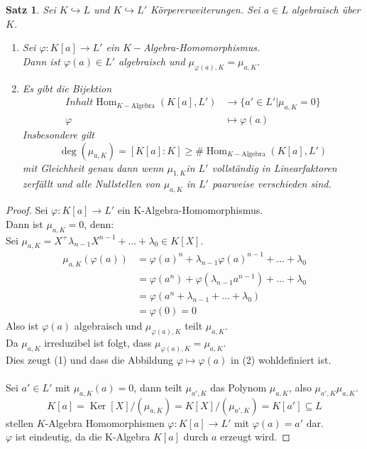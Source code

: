 \documentclass[10pt,a4paper]{article}
\newcommand{\la}{\ensuremath{\lambda}}
\newcommand{\Hom}{\operatorname{Hom}}
\newcommand{\Ker}{\ensuremath{\operatorname{Ker}}}
\newcounter{thm}[section]
\theoremstyle{definition}
\theoremstyle{plain}
\newtheorem{satz}[thm]{Satz}
\theoremstyle{remark}
\begin{document}
\begin{satz}
	Sei $K\hookrightarrow L$ und $K\hookrightarrow L'$ Körpererweiterungen. Sei $a\in L$ algebraisch über $K$.
	\begin{enumerate}
		\item Sei $\varphi:K[a]\to L'$ ein $K-$Algebra-Homomorphismus.\\
		Dann ist $\varphi(a)\in L'$ algebraisch und $\mu_{\varphi(a),K}=\mu_{a,K}$.
		\item Es gibt die Bijektion
		\begin{align*}
		Inhalt\Hom_{K-\text{Algebra}}(K[a],L')&\rightarrow \{a'\in L'|\mu_{a,K}=0\}\\
		\varphi&\mapsto\varphi(a)
		\end{align*}
		Insbesondere gilt 
		\[\deg(\mu_{a,K})=[K[a]:K]\geq \#\Hom_{K-\text{Algebra}}(K[a],L')\]
		mit Gleichheit genau dann wenn $\mu_{1,K}$in $L'$ vollständig in Linearfaktoren zerfällt und alle Nullstellen von $\mu_{a,K}$ in $L'$ paarweise verschieden sind.
	\end{enumerate}
\end{satz}
\begin{proof}
	Sei $\varphi:K[a]\rightarrow L'$ ein K-Algebra-Homomorphismus.\\
	Dann ist $\mu_{a,K}=0$, denn:\\
	Sei $\mu_{a,K}=X^+\la_{n-1}X^{n-1}+...+\la_0\in K[X]$.
	\begin{align*}
	\mu_{a,K}(\varphi(a))&=\varphi(a)^n+\la_{n-1}\varphi(a)^{n-1}+...+\la_0\\
	&=\varphi(a^n)+\varphi\left(\la_{n-1}a^{n-1}\right)+...+\la_0\\
	&=\varphi\left(a^n+\la_{n-1}+...+\la_0\right)\\
	&=\varphi(0)=0
	\end{align*}
	Also ist $\varphi(a)$ algebraisch und $\mu_{\varphi(a),K}$ teilt $\mu_{a,K}$.\\
	Da $\mu_{a,K}$ irreduzibel ist folgt, dass $\mu_{\varphi(a),K}=\mu_{a,K}$.\\
	Dies zeugt (1) und dass die Abbildung $\varphi\mapsto \varphi(a)$ in (2) wohldefiniert ist.\\
	\\
	Sei $a'\in L'$ mit $\mu_{a,K}(a)=0$, dann teilt $\mu_{a',K}$ das Polynom $\mu_{a,K}$, also $\mu_{a',K}\mu_{a,K}$.
	\[K[a]=\Ker[X]/(\mu_{a,K})=K[X]/(\mu_{a',K})=K[a']\subseteq L\]
	stellen $K$-Algebra Homomorphismen $\varphi:K[a]\rightarrow L'$ mit $\varphi(a)=a'$ dar.\\
	$\varphi$ ist eindeutig, da die K-Algebra $K[a]$ durch $a$ erzeugt wird.
\end{proof}
\end{document}
